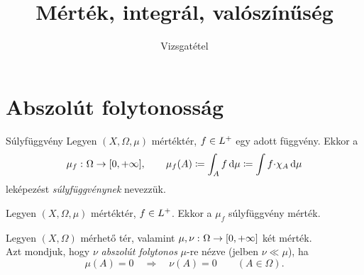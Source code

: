 \documentclass[
]{elteikthesis}[2024/04/26]
\title{Mérték, integrál, valószínűség} %
\subtitle{\circled{21} Vizsgatétel}
\begin{document}
	
	
	\section{Abszolút folytonosság}
	
	\begin{definition}{Súlyfüggvény}{}
		Legyen \( (X, \Omega, \mu) \) mértéktér, 
		\( f \in L^+ \) egy adott függvény. Ekkor a
		\[
			\mu_f \,\colon \Omega \to [0, +\infty], \qquad 
			\mu_f(A) \coloneq 
			\int_A f \mathop{}\!\mathrm{d}{\mu} \coloneq 
			\int f {\cdot} \chi_A \mathop{}\!\mathrm{d}{\mu}
		\]
		leképezést \emph{súlyfüggvénynek} nevezzük.
	\end{definition}
	
	
	\begin{statement}{}{}
		Legyen \( (X, \Omega, \mu) \) mértéktér, \( f \in L^+ \).
		Ekkor a \( \mu_f \) súlyfüggvény mérték.
	\end{statement}
	
	\begin{definition}{}{}
		Legyen \( (X, \Omega) \) mérhető tér, 
		valamint \( \mu, \nu \,\colon \Omega \to [0, +\infty] \) két mérték.\\[6pt]
		Azt mondjuk, 
		hogy \( \nu \) \emph{abszolút folytonos} \( \mu \)-re nézve (jelben \( \nu \ll \mu \)), ha
		\[
			\mu(A) = 0
			\quad \Longrightarrow \quad
			\nu(A) = 0
			\qquad (A \in \Omega).
		\]
	\end{definition}
	
\end{document}
